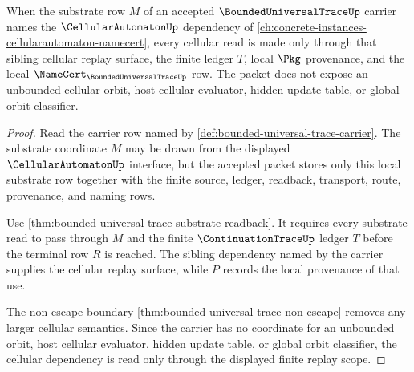 \begin{theorem}
\label{thm:bounded-universal-trace-cellular-replay-scope}
When the substrate row $M$ of an accepted $\BoundedUniversalTraceUp$ carrier
names the $\CellularAutomatonUp$ dependency of
\autoref{ch:concrete-instances-cellularautomaton-namecert}, every cellular
read is made only through that sibling cellular replay surface, the finite
ledger $T$, local $\Pkg$ provenance, and the local
$\NameCert_{\BoundedUniversalTraceUp}$ row. The packet does not expose an
unbounded cellular orbit, host cellular evaluator, hidden update table, or
global orbit classifier.
\end{theorem}
\begin{proof}
Read the carrier row named by
\autoref{def:bounded-universal-trace-carrier}. The substrate coordinate $M$
may be drawn from the displayed $\CellularAutomatonUp$ interface, but the
accepted packet stores only this local substrate row together with the finite
source, ledger, readback, transport, route, provenance, and naming rows.

Use \autoref{thm:bounded-universal-trace-substrate-readback}. It requires
every substrate read to pass through $M$ and the finite
$\ContinuationTraceUp$ ledger $T$ before the terminal row $R$ is reached.
The sibling dependency named by the carrier supplies the cellular replay
surface, while $P$ records the local provenance of that use.

The non-escape boundary
\autoref{thm:bounded-universal-trace-non-escape} removes any larger cellular
semantics. Since the carrier has no coordinate for an unbounded orbit, host
cellular evaluator, hidden update table, or global orbit classifier, the
cellular dependency is read only through the displayed finite replay scope.
\end{proof}

